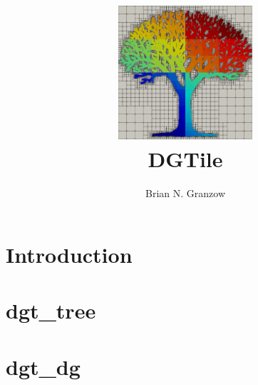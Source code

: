\documentclass[12pt]{report}
\title{\includegraphics[width=5cm]{../logo.png}\\DGTile}
\author{Brian N. Granzow}
\date{}
\begin{document}
\maketitle
\tableofcontents
\chapter{Introduction}
\chapter{dgt\_tree}

\chapter{dgt\_dg}

\end{document}
